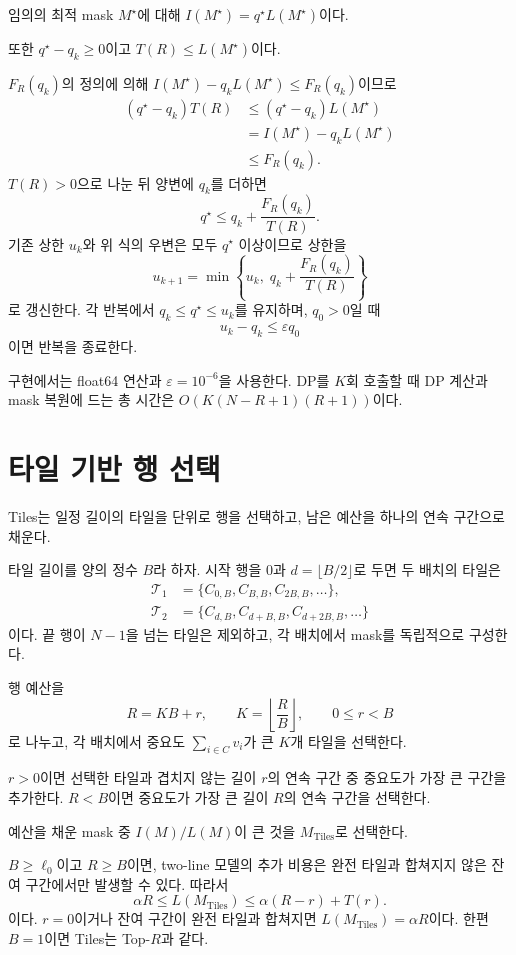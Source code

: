 임의의 최적 mask $M^\star$에 대해 $I(M^\star)=q^\star L(M^\star)$이다.

또한 $q^\star-q_k\ge0$이고 $T(R)\le L(M^\star)$이다.

$F_R(q_k)$의 정의에 의해 $I(M^\star)-q_kL(M^\star)\le F_R(q_k)$이므로
\[
\begin{aligned}
(q^\star-q_k)T(R)
&\le(q^\star-q_k)L(M^\star)\\
&=I(M^\star)-q_kL(M^\star)\\
&\le F_R(q_k).
\end{aligned}
\]
$T(R)>0$으로 나눈 뒤 양변에 $q_k$를 더하면
\[
q^\star
\le q_k+\frac{F_R(q_k)}{T(R)}.
\]
기존 상한 $u_k$와 위 식의 우변은 모두 $q^\star$ 이상이므로 상한을
\[
u_{k+1}
=\min\left\{
u_k,\;
q_k+\frac{F_R(q_k)}{T(R)}
\right\}
\]
로 갱신한다. 각 반복에서 $q_k\le q^\star\le u_k$를 유지하며, $q_0>0$일 때
\[
u_k-q_k\le\varepsilon q_0
\]
이면 반복을 종료한다.

구현에서는 float64 연산과 $\varepsilon=10^{-6}$을 사용한다. DP를 $K$회 호출할 때 DP 계산과 mask 복원에 드는 총 시간은 $O(K(N-R+1)(R+1))$이다.

\section{타일 기반 행 선택}\label{sec:tiles}

Tiles는 일정 길이의 타일을 단위로 행을 선택하고, 남은 예산을 하나의 연속 구간으로 채운다.

타일 길이를 양의 정수 $B$라 하자. 시작 행을 $0$과 $d=\lfloor B/2\rfloor$로 두면 두 배치의 타일은
\[
\boxed{
\begin{aligned}
\mathcal T_1&=\{C_{0,B},C_{B,B},C_{2B,B},\ldots\},\\
\mathcal T_2&=\{C_{d,B},C_{d+B,B},C_{d+2B,B},\ldots\}
\end{aligned}
}
\]
이다. 끝 행이 $N-1$을 넘는 타일은 제외하고, 각 배치에서 mask를 독립적으로 구성한다.

행 예산을
\[
R=KB+r,
\qquad
K=\left\lfloor\frac RB\right\rfloor,
\qquad
0\le r<B
\]
로 나누고, 각 배치에서 중요도 $\sum_{i\in C}v_i$가 큰 $K$개 타일을 선택한다.

$r>0$이면 선택한 타일과 겹치지 않는 길이 $r$의 연속 구간 중 중요도가 가장 큰 구간을 추가한다. $R<B$이면 중요도가 가장 큰 길이 $R$의 연속 구간을 선택한다.

예산을 채운 mask 중 $I(M)/L(M)$이 큰 것을 $M_{\mathrm{Tiles}}$로 선택한다.

$B\ge\ell_0$이고 $R\ge B$이면, two-line 모델의 추가 비용은 완전 타일과 합쳐지지 않은 잔여 구간에서만 발생할 수 있다. 따라서
\[
\alpha R
\le L(M_{\mathrm{Tiles}})
\le\alpha(R-r)+T(r).
\]
이다. $r=0$이거나 잔여 구간이 완전 타일과 합쳐지면 $L(M_{\mathrm{Tiles}})=\alpha R$이다. 한편 $B=1$이면 Tiles는 Top-$R$과 같다.


